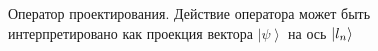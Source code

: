 \begin{figure}
\centering



\caption{Оператор проектирования. Действие оператора может быть
  интерпретировано как проекция вектора $\left|\psi\right>$ на ось $\ket{l_n}$}
\label{figAddProject}
\end{figure}
